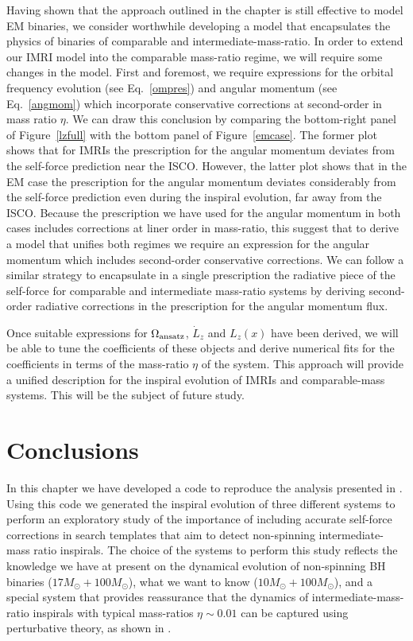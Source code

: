 Having shown that the approach outlined in the chapter is still effective to model EM binaries, we consider worthwhile developing a model that encapsulates the physics of binaries of comparable and intermediate-mass-ratio. In order to extend our IMRI model into the comparable mass-ratio regime, we will require some changes in the model.  First and foremost, we require expressions for the orbital frequency evolution (see Eq.~\eqref{ompres}) and angular momentum (see Eq.~\eqref{angmom}) which incorporate conservative corrections at second-order in mass ratio \(\eta\). We can draw this conclusion by comparing the bottom-right panel of Figure~\ref{lzfull} with the bottom panel of Figure~\ref{emcase}. The former plot shows that for IMRIs the prescription for the angular momentum  deviates from the self-force prediction near the ISCO. However, the latter plot shows that in the EM case the prescription for the angular momentum deviates considerably from the self-force prediction even during the inspiral 
evolution, far away from the ISCO. Because the prescription we have used for the angular momentum in both cases includes corrections at liner order in mass-ratio, this suggest that to derive a model that unifies both regimes we require  an expression for the angular momentum which includes second-order conservative corrections. We can follow a similar strategy to encapsulate in a single prescription the radiative piece of the self-force for comparable and intermediate mass-ratio systems by deriving second-order radiative corrections in the prescription for the angular momentum flux. 

Once suitable expressions for \(\Omega_{\rm ansatz}\), \(\dot{L}_z\) and \(L_{z}(x)\) have been derived, we will be able to tune the coefficients of these objects and derive numerical fits for the coefficients in terms of the mass-ratio \(\eta\) of the system. This approach will provide a unified description for the inspiral evolution of IMRIs and comparable-mass systems. This will be the subject of future study.


 \section{Conclusions}
 \label{s4}
 
 In this chapter we have developed a code to reproduce the analysis presented in \cite{BuonannoEOBv2Main}. Using this code we generated the inspiral evolution of three different systems to perform an exploratory study of the importance of including accurate self-force corrections in search templates that aim to detect non-spinning intermediate-mass ratio inspirals. The choice of the systems to perform this study reflects the knowledge we have at present on the dynamical evolution of non-spinning BH binaries (\(17M_{\odot} + 100M_{\odot}\)), what we want to know (\(10 M_{\odot} + 100M_{\odot}\)), and a special system that  provides reassurance that the dynamics of intermediate-mass-ratio inspirals with typical mass-ratios \(\eta\sim 0.01\) can be captured using perturbative theory, as shown in \cite{carlos,ulr}. 
 
